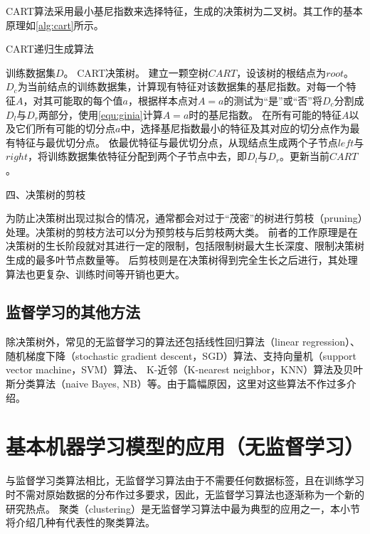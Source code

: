 CART算法采用最小基尼指数来选择特征，生成的决策树为二叉树。其工作的基本原理如\autoref{alg:cart}所示。
\begin{breakablealgorithm}
    \caption[CART生成算法]{CART递归生成算法\cite{Li2017}}
    \label{alg:cart}
    \begin{algorithmic}[1] %
        \Require 训练数据集$D$。
        \Ensure CART决策树。
        \State 建立一颗空树$CART$，设该树的根结点为$root$。
            \State $D_c$为当前结点的训练数据集，计算现有特征对该数据集的基尼指数。对每一个特征$A$，对其可能取的每个值$a$，根据样本点对$A=a$的测试为“是”或“否”将$D_c$分割成$D_l$与$D_r$两部分，使用\autoref{equ:ginia}计算$A=a$时的基尼指数。
            \State 在所有可能的特征$A$以及它们所有可能的切分点$a$中，选择基尼指数最小的特征及其对应的切分点作为最有特征与最优切分点。
            \State 依最优特征与最优切分点，从现结点生成两个子节点$left$与$right$，将训练数据集依特征分配到两个子节点中去，即$D_l$与$D_r$。更新当前$CART$。
                \State {}
            \Else    
                \State {}
                \State {}
            \EndIf
        \EndFunction
    \end{algorithmic}
\end{breakablealgorithm}

四、决策树的剪枝

为防止决策树出现过拟合的情况，通常都会对过于“茂密”的树进行剪枝（pruning）处理。决策树的剪枝方法可以分为预剪枝与后剪枝两大类。
前者的工作原理是在决策树的生长阶段就对其进行一定的限制，包括限制树最大生长深度、限制决策树生成的最多叶节点数量等。
后剪枝则是在决策树得到完全生长之后进行，其处理算法也更复杂、训练时间等开销也更大\cite{Zhou2016,Liu2019}。

\subsection{监督学习的其他方法}
除决策树外，常见的无监督学习的算法还包括线性回归算法（linear regression）、随机梯度下降（stochastic gradient descent，SGD）算法、支持向量机（support vector machine，SVM）算法、
K-近邻（K-nearest neighbor，KNN）算法及贝叶斯分类算法（naive Bayes, NB）等\cite{Zhou2016,Li2017,Liu2019,Aurélien2018}。由于篇幅原因，这里对这些算法不作过多介绍。


\section{基本机器学习模型的应用（无监督学习）}
与监督学习类算法相比，无监督学习算法由于不需要任何数据标签，且在训练学习时不需对原始数据的分布作过多要求，因此，无监督学习算法也逐渐称为一个新的研究热点。
聚类（clustering）是无监督学习算法中最为典型的应用之一，本小节将介绍几种有代表性的聚类算法。

